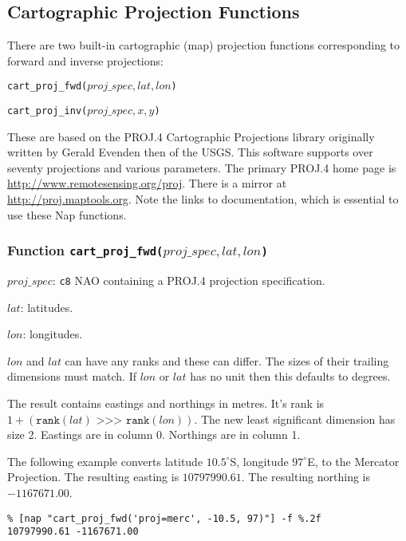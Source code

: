 \subsection{Cartographic Projection Functions}
\label{function-Cart-Proj}

There are two built-in cartographic (map) projection functions corresponding to forward
and inverse projections:
\begin{bullets}
    \item \texttt{cart\_proj\_fwd(}$\mathit{proj\_spec, lat, lon}$\texttt{)} 
    \item \texttt{cart\_proj\_inv(}$\mathit{proj\_spec, x, y}$\texttt{)} 
\end{bullets}

These are based on the 
PROJ.4 Cartographic Projections library originally written by Gerald Evenden then of the USGS.
This software supports over seventy projections and various parameters.
The primary PROJ.4 home page is
\href{http://www.remotesensing.org/proj}{http://www.remotesensing.org/proj}.
There is a mirror at
\href{http://proj.maptools.org}{http://proj.maptools.org}. 
Note the links to documentation, which is essential to use these Nap functions.

\subsubsection{Function \texttt{cart\_proj\_fwd(}$\mathit{proj\_spec, lat, lon}$\texttt{)}}
\label{function-cart-proj-fwd}

\begin{simpleitems}
    \item $\mathit{proj\_spec}$: \texttt{c8} NAO containing a PROJ.4 projection specification.
    \item $\mathit{lat}$: latitudes.
    \item $\mathit{lon}$: longitudes.
\end{simpleitems}

$\mathit{lon}$ and $\mathit{lat}$ can have any ranks and these can differ.
The sizes of their trailing dimensions must match.
If $\mathit{lon}$ or $\mathit{lat}$ has no unit then this defaults to degrees.

The result contains eastings and northings in metres.
It's rank is
$1 + (\texttt{rank}(\mathit{lat}) \texttt{ >>> } \texttt{rank}(\mathit{lon}))$.
The new least significant dimension has size 2.
Eastings are in column 0.  Northings are in column 1.

The following example converts 
latitude $10.5^{\circ}$S,
longitude $97^{\circ}$E,
to the Mercator Projection.
The resulting easting is $10797990.61$.
The resulting northing is $-1167671.00$.
\begin{verbatim}
% [nap "cart_proj_fwd('proj=merc', -10.5, 97)"] -f %.2f
10797990.61 -1167671.00
\end{verbatim}

